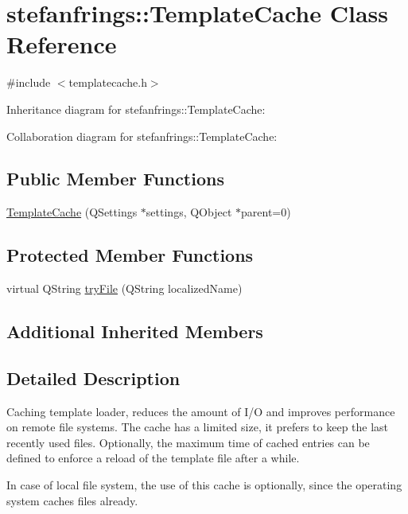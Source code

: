 \hypertarget{classstefanfrings_1_1_template_cache}{}\section{stefanfrings\+:\+:Template\+Cache Class Reference}
\label{classstefanfrings_1_1_template_cache}


{\ttfamily \#include $<$templatecache.\+h$>$}



Inheritance diagram for stefanfrings\+:\+:Template\+Cache\+:


Collaboration diagram for stefanfrings\+:\+:Template\+Cache\+:
\subsection*{Public Member Functions}
\begin{DoxyCompactItemize}
\item 
\mbox{\hyperlink{classstefanfrings_1_1_template_cache_aef9bd0bd1ca5a4592054e1608eae80dc}{Template\+Cache}} (Q\+Settings $\ast$settings, Q\+Object $\ast$parent=0)
\end{DoxyCompactItemize}
\subsection*{Protected Member Functions}
\begin{DoxyCompactItemize}
\item 
virtual Q\+String \mbox{\hyperlink{classstefanfrings_1_1_template_cache_a65584abe7d62c93659c741f41bdeeada}{try\+File}} (Q\+String localized\+Name)
\end{DoxyCompactItemize}
\subsection*{Additional Inherited Members}


\subsection{Detailed Description}
Caching template loader, reduces the amount of I/O and improves performance on remote file systems. The cache has a limited size, it prefers to keep the last recently used files. Optionally, the maximum time of cached entries can be defined to enforce a reload of the template file after a while. 

In case of local file system, the use of this cache is optionally, since the operating system caches files already. 

